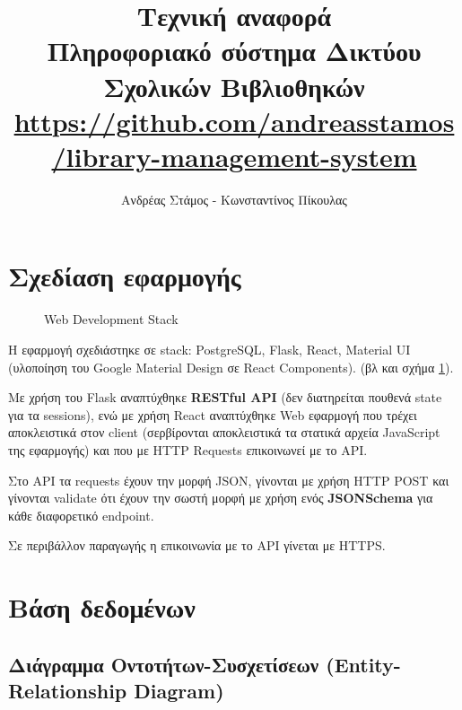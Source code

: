\documentclass[a4paper]{article}
\title{Τεχνική αναφορά\\\Large Πληροφοριακό σύστημα Δικτύου Σχολικών Βιβλιοθηκών\\\vspace{1em} \normalsize \url{https://github.com/andreasstamos/library-management-system}}
\author{Ανδρέας Στάμος - Κωνσταντίνος Πίκουλας}
\date{}
\begin{document}
\maketitle
\thispagestyle{fancy}

\tableofcontents

\section{Σχεδίαση εφαρμογής}

\begin{figure}[H]
\centering

\hspace{1em}
\hspace{1em}
\hspace{1em}
\caption{Web Development Stack}
\label{stack_logos}
\end{figure}

\par Η εφαρμογή σχεδιάστηκε σε stack: PostgreSQL, Flask, React, Material UI (υλοποίηση του Google Material Design σε React Components). (βλ και σχήμα \ref{stack_logos}).

\par Με χρήση του Flask αναπτύχθηκε \textbf{RESTful API} (δεν διατηρείται πουθενά state για τα sessions), ενώ με χρήση React αναπτύχθηκε Web εφαρμογή που τρέχει αποκλειστικά στον client (σερβίρονται αποκλειστικά τα στατικά αρχεία JavaScript της εφαρμογής) και που με HTTP Requests επικοινωνεί με το API.

\par Στο API τα requests έχουν την μορφή JSON, γίνονται με χρήση HTTP POST και γίνονται validate ότι έχουν την σωστή μορφή με χρήση ενός \textbf{JSONSchema} για κάθε διαφορετικό endpoint.

\par Σε περιβάλλον παραγωγής η επικοινωνία με το API γίνεται με HTTPS.

\section{Βάση δεδομένων}

\subsection{Διάγραμμα Οντοτήτων-Συσχετίσεων (Entity-Relationship Diagram)}
\end{document}
